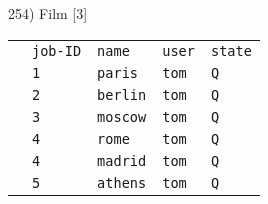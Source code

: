 \documentclass[10pt]{article}
\begin{document}
	254) Film [3]
	\begin{table}[htbp]
		\begin{tabular}{rllll}	
			&\texttt{job-ID} & \texttt{name}& \texttt{user} & \texttt{state} \\
			&\texttt{1} & \texttt{paris} & \texttt{tom} & \texttt{Q}\\
			&\texttt{2} & \texttt{berlin}& \texttt{tom}&\texttt{Q}\\
			&\texttt{3} & \texttt{moscow}& \texttt{tom}&\texttt{Q}\\
			\rightarrow& \texttt{4}&  \texttt{rome}& \texttt{tom}& \texttt{Q}\\
			&\texttt{4} & \texttt{madrid}&  \texttt{tom}&\texttt{Q}\\
			&\texttt{5} & \texttt{athens}& \texttt{tom}& \texttt{Q} \\
		\end{tabular}
	\end{table}
\end{document}
